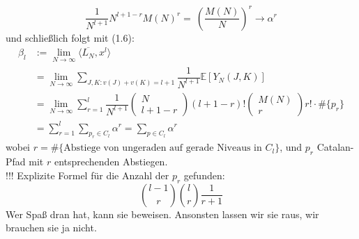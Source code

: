 \documentclass[a4paper, 11pt]{scrreprt}
\newcommand{\EE}{\mathbb{E}}
\begin{document}
	\begin{equation}
		\frac {1}{N^{l+1}} N^{l+1-r}M(N)^r =~ \left( \dfrac{M(N)}{N}\right)^{r}\to \alpha^r
	\end{equation}
und schließlich folgt mit (1.6):
	\begin{align*}
		\beta_l &:= \lim_{N\to\infty} \langle \overline{L_N}, x^l \rangle\\
		&= \lim_{N \to \infty} \sum_{J,K: v(J)+v(K) = l+1} \dfrac{1}{N^{l+1}}\EE[Y_N(J,K)]\\
		&= \lim_{N \to \infty} \sum_{r=1}^{l} \dfrac{1}{N^{l+1}} \begin{pmatrix} N\\ l+1-r\end{pmatrix} (l+1-r)! \begin{pmatrix} M(N)\\r\end{pmatrix} r!	\cdot \#\{p_r \}\\
		&= \sum_{r=1}^{l} \sum_{p_{r} \in C_{l}} \alpha^{r} = \sum_{p\in C_l} \alpha^r
	\end{align*}
wobei \(r=\#\{\text{Abstiege von ungeraden auf gerade Niveaus in } C_l\}\), und \(p_r\) Catalan-Pfad mit \(r\) entsprechenden Abstiegen.\\

!!! Explizite Formel für die Anzahl der $ p_r $ gefunden: \[ \binom{l-1}{r} \binom{l}{r} \frac{1}{r+1} \]
Wer Spaß dran hat, kann sie beweisen. Ansonsten lassen wir sie raus, wir brauchen sie ja nicht.\\
\end{document}

